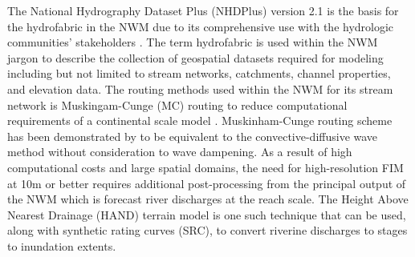 The National Hydrography Dataset Plus (NHDPlus) version 2.1 is the basis for the hydrofabric in the NWM due to its comprehensive use with the hydrologic communities' stakeholders \cite{mckay2012nhdplus}. 
The term hydrofabric is used within the NWM jargon to describe the collection of geospatial datasets required for modeling including but not limited to stream networks, catchments, channel properties, and elevation data. 
The routing methods used within the NWM for its stream network is Muskingam-Cunge (MC) routing to reduce computational requirements of a continental scale model \cite{bedient2008hydrology,ponce1994variable,gochis2018wrf}.
Muskinham-Cunge routing scheme has been demonstrated by  to be equivalent to the convective-diffusive wave method without consideration to wave dampening.
As a result of high computational costs and large spatial domains, the need for high-resolution FIM at 10m or better requires additional post-processing from the principal output of the NWM which is forecast river discharges at the reach scale. The Height Above Nearest Drainage (HAND) terrain model is one such technique that can be used, along with synthetic rating curves (SRC), to convert riverine discharges to stages to inundation extents.


